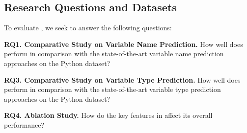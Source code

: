 \subsection{Research Questions and Datasets}

To evaluate {\tool}, we seek to answer the following questions:

\noindent\textbf{RQ1. Comparative Study on Variable Name Prediction.}  How well does {\tool} perform in comparison with the state-of-the-art variable name prediction approaches on the Python dataset?

{}

\noindent\textbf{RQ3. Comparative Study on Variable Type Prediction.}  How well does {\tool} perform in comparison with the state-of-the-art variable type prediction approaches on the Python dataset?

\noindent\textbf{RQ4. Ablation Study.} How do the key features in {\tool} affect its overall performance?


